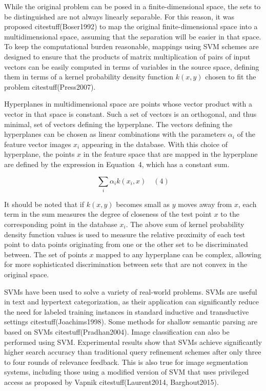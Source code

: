 \documentclass[preprint,12pt]{elsarticle}
\begin{document}
While the original problem can be posed in a finite-dimensional space, the sets to be distinguished are not always linearly separable. For this reason, it was proposed citestuff(Boser1992) to map the original finite-dimensional space into a multidimensional space, assuming that the separation will be easier in that space. To keep the computational burden reasonable, mappings using SVM schemes are designed to ensure that the products of matrix multiplication of pairs of input vectors can be easily computed in terms of variables in the source space, defining them in terms of a kernel probability density function $k(x, y)$ chosen to fit the problem citestuff(Press2007).

Hyperplanes in multidimensional space are points whose vector product with a vector in that space is constant. Such a set of vectors is an orthogonal, and thus minimal, set of vectors defining the hyperplane. The vectors defining the hyperplanes can be chosen as linear combinations with the parameters $\alpha_{i}$ of the feature vector images $x_{i}$ appearing in the database. With this choice of hyperplane, the points $x$ in the feature space that are mapped in the hyperplane are defined by the expression 
in Equation~4, which has a constant sum.

\begin{equation}
	\sum_{i} \alpha_{i}k(x_{i},x)
	\quad\left(4\right)
\end{equation}

It should be noted that if $k(x, y)$ becomes small as $y$ moves away from $x$, each term in the sum measures the degree of closeness of the test point $x$ to the corresponding point in the database $x_{i}$. The above sum of kernel probability density function values is used to measure the relative proximity of each test point to data points originating from one or the other set to be discriminated between. The set of points $x$ mapped to any hyperplane can be complex, allowing for more sophisticated discrimination between sets that are not convex in the original space.

SVMs have been used to solve a variety of real-world problems. SVMs are useful in text and hypertext categorization, as their application can significantly reduce the need for labeled training instances in standard inductive and transductive settings citestuff(Joachims1998). Some methods for shallow semantic parsing are based on SVMs citestuff(Pradhan2004). Image classification can also be performed using SVM. Experimental results show that SVMs achieve significantly higher search accuracy than traditional query refinement schemes after only three to four rounds of relevance feedback. This is also true for image segmentation systems, including those using a modified version of SVM that uses privileged access as proposed by Vapnik citestuff(Laurent2014, Barghout2015).
\end{document}

